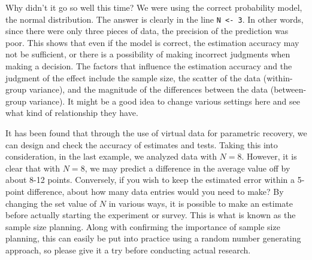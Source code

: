 \documentclass{ltjsbook}
\begin{document}
Why didn't it go so well this time? We were using the correct probability model, the normal distribution. The answer is clearly in the line \verb|N <- 3|. In other words, since there were only three pieces of data, the precision of the prediction was poor.
This shows that even if the model is correct, the estimation accuracy may not be sufficient, or there is a possibility of making incorrect judgments when making a decision. The factors that influence the estimation accuracy and the judgment of the effect include the sample size, the scatter of the data (within-group variance), and the magnitude of the differences between the data (between-group variance). It might be a good idea to change various settings here and see what kind of relationship they have.

It has been found that through the use of virtual data for parametric recovery, we can design and check the accuracy of estimates and tests.
Taking this into consideration, in the last example, we analyzed data with $N=8$. However, it is clear that with $N=8$, we may predict a difference in the average value off by about 8-12 points.
Conversely, if you wish to keep the estimated error within a 5-point difference, about how many data entries would you need to make? By changing the set value of $N$ in various ways, it is possible to make an estimate before actually starting the experiment or survey. This is what is known as the sample size planning. Along with confirming the importance of sample size planning, this can easily be put into practice using a random number generating approach, so please give it a try before conducting actual research.
\end{document}
